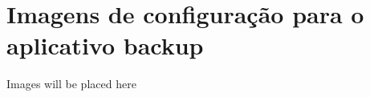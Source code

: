 \chapter{Imagens de configuração para o aplicativo backup}
\label{attachmentsImagensBackup}

Images will be placed here


